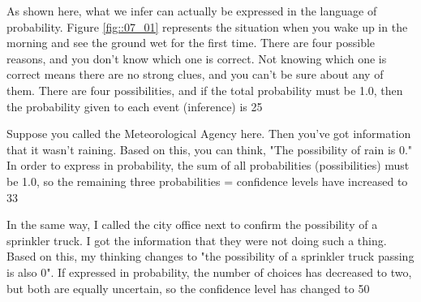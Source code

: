 As shown here, what we infer can actually be expressed in the language of probability. Figure \ref{fig::07_01} represents the situation when you wake up in the morning and see the ground wet for the first time. There are four possible reasons, and you don't know which one is correct. Not knowing which one is correct means there are no strong clues, and you can't be sure about any of them. There are four possibilities, and if the total probability must be 1.0, then the probability given to each event (inference) is 25%



Suppose you called the Meteorological Agency here. Then you've got information that it wasn't raining. Based on this, you can think, "The possibility of rain is 0." In order to express in probability, the sum of all probabilities (possibilities) must be 1.0, so the remaining three probabilities = confidence levels have increased to 33%


In the same way, I called the city office next to confirm the possibility of a sprinkler truck. I got the information that they were not doing such a thing. Based on this, my thinking changes to "the possibility of a sprinkler truck passing is also 0". If expressed in probability, the number of choices has decreased to two, but both are equally uncertain, so the confidence level has changed to 50%


